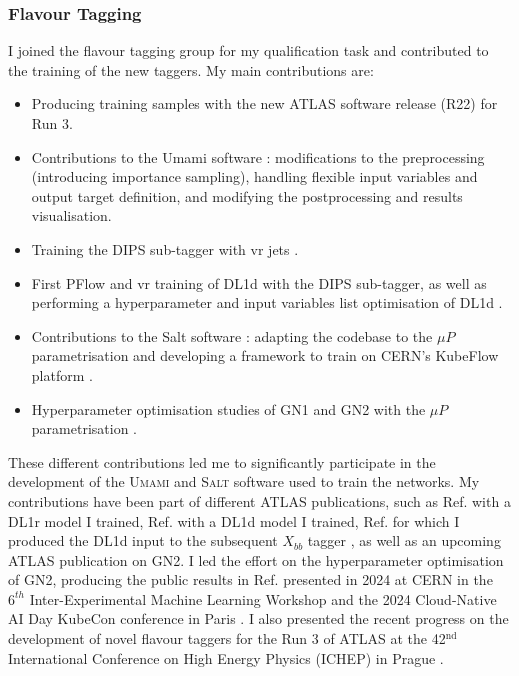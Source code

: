 \subsubsection{Flavour Tagging}
I joined the flavour tagging group for my qualification task and contributed to the training of the new taggers. My main contributions are:
\begin{itemize}
    \item Producing training samples with the new ATLAS software release (R22) for Run 3.
    \item Contributions to the Umami software \cite{UmamiCite}: modifications to the preprocessing (introducing importance sampling), handling flexible input variables and output target definition, and modifying the postprocessing and results visualisation.
    \item Training the DIPS sub-tagger with \gls{vr} jets \cite{ATL-PHYS-PUB-2020-014}.
    \item First PFlow and \gls{vr} training of DL1d with the DIPS sub-tagger, as well as performing a hyperparameter and input variables list optimisation of DL1d \cite{ATL-PLOT-FTAG-2023-01}.
    \item Contributions to the Salt software \cite{SaltCite}: adapting the codebase to the $\mu P$ parametrisation \cite{pmlr-v139-yang21c} and developing a framework to train on CERN's KubeFlow platform \cite{KubeFlowCern}. 
    \item Hyperparameter optimisation studies of GN1 and GN2 with the $\mu P$ parametrisation \cite{publicplotMUP}.
\end{itemize}
These different contributions led me to significantly participate in the development of the \textsc{Umami} \cite{UmamiCite} and \textsc{Salt} \cite{SaltCite} software used to train the networks. My contributions have been part of different ATLAS publications, such as Ref. \cite{ATL-PHYS-PUB-2022-027} with a DL1r model I trained, Ref. \cite{ATL-PLOT-FTAG-2023-01} with a DL1d model I trained, Ref. \cite{ATL-PHYS-PUB-2023-021} for which I produced the DL1d input to the subsequent $X_{bb}$ tagger \cite{ATL-PHYS-PUB-2020-019}, as well as an upcoming ATLAS publication on GN2. I led the effort on the hyperparameter optimisation of GN2, producing the public results in Ref. \cite{publicplotMUP} presented in 2024 at CERN in the $6^{th}$ Inter-Experimental Machine Learning Workshop \cite{publicplotMUP} and the 2024 Cloud-Native AI Day KubeCon conference in Paris \cite{KubeconTalk}. I also presented the recent progress on the development of novel flavour taggers for the Run 3 of ATLAS at the 42$^{\text{nd}}$ International Conference on High Energy Physics (ICHEP) in Prague \cite{Draguet:2906774}.

